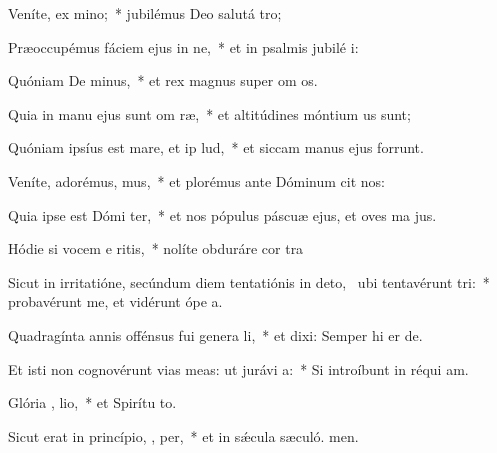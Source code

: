 \item Veníte, ex mino;~* jubilémus Deo salutá tro;
\item Præoccupémus fáciem ejus in ne,~* et in psalmis jubilé i:
\item Quóniam De  minus,~* et rex magnus super om os.
\item Quia in manu ejus sunt om  ræ,~* et altitúdines móntium us sunt;
\item Quóniam ipsíus est mare, et ip  lud,~* et siccam manus ejus forrunt.
\item Veníte, adorémus,  mus,~* et plorémus ante Dóminum  cit nos:
\item Quia ipse est Dómi  ter,~* et nos pópulus páscuæ ejus, et oves ma jus.
\item Hódie si vocem e ritis,~* nolíte obduráre cor tra
\item Sicut in irritatióne, secúndum diem tentatiónis in deto,~\pscross{} ubi tentavérunt   tri:~* probavérunt me, et vidérunt ópe a.
\item Quadragínta annis offénsus fui genera li,~* et dixi: Semper hi er de.
\item Et isti non cognovérunt vias meas: ut jurávi   a:~* Si introíbunt in réqui am.
\item Glória ,  lio,~* et Spirítu to.
\item Sicut erat in princípio,  ,  per,~* et in sǽcula sæculó. men.
